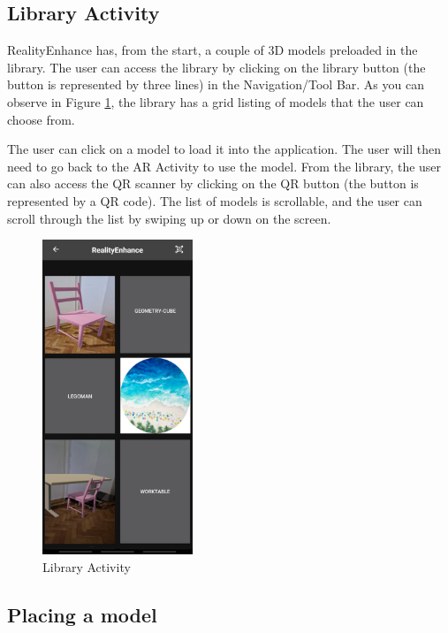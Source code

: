 \subsection{Library Activity}
RealityEnhance has, from the start, a couple of \ac{3D} models preloaded in the library. The user can access the library by clicking on the library button (the button is represented by three  lines) in the Navigation/Tool Bar. As you can observe in Figure \ref{fig:library}, the library has a grid listing of models that the user can choose from.

The user can click on a model to load it into the application. The user will then need to go back to the AR Activity to use the model. From the library, the user can also access the QR scanner by clicking on the QR button (the button is represented by a QR code). The list of models is scrollable, and the user can scroll through the list by swiping up or down on the screen.

\begin{figure}[ht]
    \begin{center}
        \includegraphics[width=0.4\textwidth]{img/App_screenshots/Library.jpg}
        \caption{Library Activity}
        \label{fig:library}
    \end{center}
\end{figure}
\pagebreak

\subsection{Placing a model}

